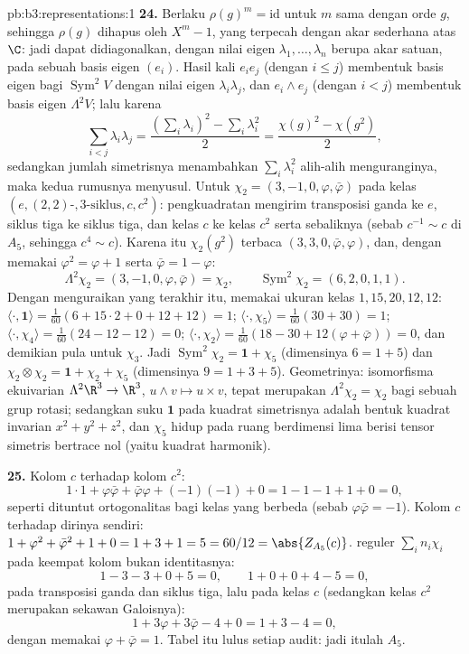 \begin{solution}{pb:b3:representations:1}
\textbf{24.} Berlaku $\rho(g)^m = \mathrm{id}$ untuk $m$ sama dengan orde
$g$, sehingga $\rho(g)$ dihapus oleh $X^m - 1$, yang terpecah dengan
akar sederhana atas $\C$: jadi dapat didiagonalkan, dengan nilai eigen
$\lambda_1, \dots, \lambda_n$ berupa akar satuan, pada sebuah
basis eigen $(e_i)$. Hasil kali $e_ie_j$ (dengan $i \leq j$) membentuk
basis eigen bagi $\operatorname{Sym}^2V$ dengan nilai eigen
$\lambda_i\lambda_j$, dan $e_i \wedge e_j$ (dengan $i < j$) membentuk basis eigen
$\Lambda^2V$; lalu karena
\[
\sum_{i<j}\lambda_i\lambda_j
= \frac{(\sum_i\lambda_i)^2 - \sum_i\lambda_i^2}2
= \frac{\chi(g)^2 - \chi(g^2)}2,
\]
sedangkan jumlah simetrisnya menambahkan $\sum_i\lambda_i^2$ alih-alih
menguranginya, maka kedua rumusnya menyusul. Untuk $\chi_2 = (3, -1,
0, \varphi, \bar\varphi)$ pada kelas $(e, (2,2)\text{-},
3\text{-siklus}, c, c^2)$: pengkuadratan mengirim transposisi
ganda ke $e$, siklus tiga ke siklus tiga, dan
kelas $c$ ke kelas $c^2$ serta sebaliknya (sebab $c^{-1} \sim
c$ di $A_5$, sehingga $c^4 \sim c$). Karena itu $\chi_2(g^2)$ terbaca $(3,
3, 0, \bar\varphi, \varphi)$, dan, dengan memakai $\varphi^2 = \varphi
+ 1$ serta $\bar\varphi = 1 - \varphi$:
\[
\Lambda^2\chi_2 = (3, -1, 0, \varphi, \bar\varphi) = \chi_2,
\qquad
\operatorname{Sym}^2\chi_2 = (6, 2, 0, 1, 1) .
\]
Dengan menguraikan yang terakhir itu, memakai ukuran kelas $1, 15, 20, 12,
12$: $\langle\cdot, \mathbf 1\rangle = \frac1{60}(6 +
15\cdot2 + 0 + 12 + 12) = 1$; $\langle\cdot, \chi_5\rangle =
\frac1{60}(30 + 30) = 1$; $\langle\cdot, \chi_4\rangle =
\frac1{60}(24 - 12 - 12) = 0$; $\langle\cdot, \chi_2\rangle =
\frac1{60}(18 - 30 + 12(\varphi + \bar\varphi)) = 0$, dan
demikian pula untuk $\chi_3$. Jadi $\operatorname{Sym}^2\chi_2 =
\mathbf 1 + \chi_5$ (dimensinya $6 = 1 + 5$) dan
$\chi_2\otimes\chi_2 = \mathbf 1 + \chi_2 + \chi_5$
(dimensinya $9 = 1 + 3 + 5$). Geometrinya: isomorfisma
ekuivarian $\Lambda^2\R^3 \to \R^3$, $u \wedge v \mapsto u
\times v$, tepat merupakan $\Lambda^2\chi_2 = \chi_2$ bagi sebuah
grup rotasi; sedangkan suku $\mathbf 1$ pada kuadrat
simetrisnya adalah bentuk kuadrat invarian $x^2 + y^2 + z^2$, dan
$\chi_5$ hidup pada ruang berdimensi lima berisi tensor
simetris bertrace nol (yaitu kuadrat harmonik).

\textbf{25.} Kolom $c$ terhadap kolom $c^2$:
\[
1\cdot1 + \varphi\bar\varphi + \bar\varphi\varphi +
(-1)(-1) + 0 = 1 - 1 - 1 + 1 + 0 = 0,
\]
seperti dituntut ortogonalitas bagi kelas yang berbeda (sebab $\varphi
\bar\varphi = -1$). Kolom $c$ terhadap dirinya sendiri: $1 +
\varphi^2 + \bar\varphi^2 + 1 + 0 = 1 + 3 + 1 = 5 = 60/12 =
\abs{Z_{A_5}(c)}$.  reguler $\sum_in_i\chi_i$ pada
keempat kolom bukan identitasnya:
\[
1 - 3 - 3 + 0 + 5 = 0, \qquad
1 + 0 + 0 + 4 - 5 = 0,
\]
pada transposisi ganda dan siklus tiga, lalu pada kelas
$c$ (sedangkan kelas $c^2$ merupakan sekawan Galoisnya):
\[
1 + 3\varphi + 3\bar\varphi - 4 + 0 = 1 + 3 - 4 = 0,
\]
dengan memakai $\varphi + \bar\varphi = 1$. Tabel itu lulus setiap
audit: jadi itulah  $A_5$.

\end{solution}
